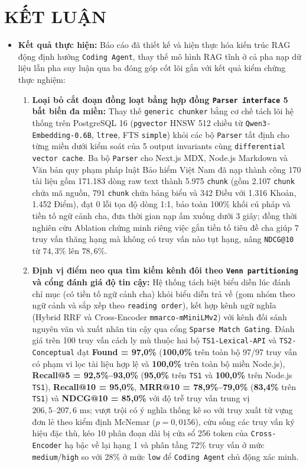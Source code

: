 \section{KẾT LUẬN}

\begin{itemize}
    \item \textbf{Kết quả thực hiện:} Báo cáo đã thiết kế và hiện thực hóa kiến trúc RAG động định hướng \texttt{Coding Agent}, thay thế mô hình RAG tĩnh ở cả pha nạp dữ liệu lẫn pha suy luận qua ba đóng góp cốt lõi gắn với kết quả kiểm chứng thực nghiệm:
    \begin{enumerate}
        \item \textbf{Loại bỏ cắt đoạn đồng loạt bằng hợp đồng \texttt{Parser interface} 5 bất biến đa miền:} Thay thế \texttt{generic chunker} bằng cơ chế tách lõi hệ thống trên PostgreSQL 16 (\texttt{pgvector} HNSW 512 chiều từ \texttt{Qwen3-Embedding-0.6B}, \texttt{ltree}, FTS \texttt{simple}) khỏi các bộ \texttt{Parser} tất định cho từng miền dưới kiểm soát của 5 output invariants cùng \texttt{differential vector cache}. Ba bộ \texttt{Parser} cho Next.js MDX, Node.js Markdown và Văn bản quy phạm pháp luật Bảo hiểm Việt Nam đã nạp thành công 170 tài liệu gồm 171.183 dòng raw text thành 5.975 \texttt{chunk} (gồm 2.107 \texttt{chunk} chứa mã nguồn, 791 \texttt{chunk} chứa bảng biểu và 342 Điều với 1.316 Khoản, 1.452 Điểm), đạt 0 lỗi tọa độ dòng 1:1, bảo toàn 100\% khối cú pháp và tiền tố ngữ cảnh cha, đưa thời gian nạp ấm xuống dưới 3 giây; đồng thời nghiên cứu Ablation chứng minh riêng việc gắn tiền tố tiêu đề cha giúp 7 truy vấn thăng hạng mà không có truy vấn nào tụt hạng, nâng \texttt{NDCG@10} từ $74,3\%$ lên $78,6\%$.
        \item \textbf{Định vị điểm neo qua tìm kiếm kênh đôi theo \texttt{Venn partitioning} và cổng đánh giá độ tin cậy:} Hệ thống tách biệt biểu diễn lúc đánh chỉ mục (có tiền tố ngữ cảnh cha) khỏi biểu diễn trả về (gom nhóm theo ngữ cảnh và sắp xếp theo \texttt{reading order}), kết hợp kênh ngữ nghĩa (Hybrid RRF và Cross-Encoder \texttt{mmarco-mMiniLMv2}) với kênh đối sánh nguyên văn và xuất nhãn tin cậy qua cổng \texttt{Sparse Match Gating}. Đánh giá trên 100 truy vấn cách ly mù thuộc hai bộ \texttt{TS1-Lexical-API} và \texttt{TS2-Conceptual} đạt \textbf{Found = 97,0\%} (\textbf{100,0\%} trên toàn bộ 97/97 truy vấn có phạm vi lọc tài liệu hợp lệ và \textbf{100,0\%} trên toàn bộ miền Node.js), \textbf{Recall@5 = 92,5\%--93,0\%} (\textbf{95,0\%} trên \texttt{TS1} và \textbf{100,0\%} trên Node.js \texttt{TS1}), \textbf{Recall@10 = 95,0\%}, \textbf{MRR@10 = 78,9\%--79,0\%} (\textbf{83,4\%} trên \texttt{TS1}) và \textbf{NDCG@10 = 85,0\%} với độ trễ truy vấn trung vị $206,5\text{--}207,6\text{ ms}$; vượt trội có ý nghĩa thống kê so với truy xuất từ vựng đơn lẻ theo kiểm định McNemar ($p = 0,0156$), cứu sống các truy vấn ký hiệu đặc thù, kéo 10 phân đoạn dài bị cửa sổ 256 token của \texttt{Cross-Encoder} hạ bậc về lại hạng 1 và phân tầng 72\% truy vấn ở mức \texttt{medium}/\texttt{high} so với 28\% ở mức \texttt{low} để \texttt{Coding Agent} chủ động xác minh.

\end{enumerate}
\end{itemize}
